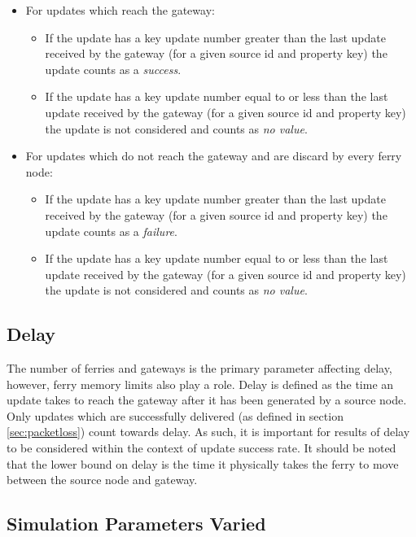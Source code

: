 \begin{itemize}
\item For updates which reach the gateway:
	\begin{itemize}
	\item If the update has a key update number greater than the last update received by the gateway (for a given source id and property key) the update counts as a \emph{success}.
	\item If the update has a key update number equal to or less than the last update received by the gateway (for a given source id and property key) the update is not considered and counts as \emph{no value}.
	\end{itemize}
\item For updates which do not reach the gateway and are discard by every ferry node:
	\begin{itemize}
	\item If the update has a key update number greater than the last update received by the gateway (for a given source id and property key) the update counts as a \emph{failure}.
	\item If the update has a key update number equal to or less than the last update received by the gateway (for a given source id and property key) the update is not considered and counts as \emph{no value}.
	\end{itemize}
\end{itemize}

\subsection{Delay}
\label{sec:delay}

The number of ferries and gateways is the primary parameter affecting delay, however, ferry memory limits also play a role.
Delay is defined as the time an update takes to reach the gateway after it has been generated by a source node.
Only updates which are successfully delivered (as defined in section \ref{sec:packetloss}) 
count towards delay.
As such, it is important for results of delay to be considered within the context of update success rate.
It should be noted that the lower bound on delay is the time it physically takes the ferry to move between the source node and gateway.

\subsection{Simulation Parameters Varied} %

